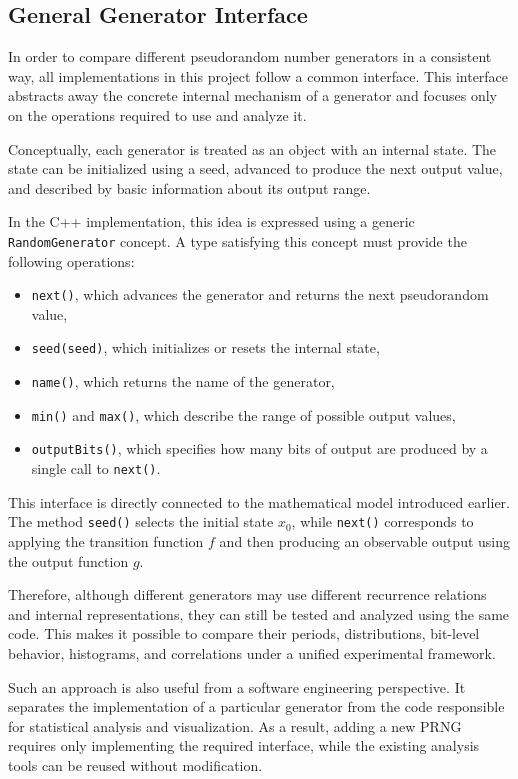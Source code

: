 \subsection{General Generator Interface}

In order to compare different pseudorandom number generators in a consistent way, all implementations in this project follow a common interface. This interface abstracts away the concrete internal mechanism of a generator and focuses only on the operations required to use and analyze it.

Conceptually, each generator is treated as an object with an internal state. The state can be initialized using a seed, advanced to produce the next output value, and described by basic information about its output range.

In the C++ implementation, this idea is expressed using a generic \texttt{RandomGenerator} concept. A type satisfying this concept must provide the following operations:

\begin{itemize}
    \item \texttt{next()}, which advances the generator and returns the next pseudorandom value,
    \item \texttt{seed(seed)}, which initializes or resets the internal state,
    \item \texttt{name()}, which returns the name of the generator,
    \item \texttt{min()} and \texttt{max()}, which describe the range of possible output values,
    \item \texttt{outputBits()}, which specifies how many bits of output are produced by a single call to \texttt{next()}.
\end{itemize}

This interface is directly connected to the mathematical model introduced earlier. The method \texttt{seed()} selects the initial state $x_0$, while \texttt{next()} corresponds to applying the transition function $f$ and then producing an observable output using the output function $g$.

Therefore, although different generators may use different recurrence relations and internal representations, they can still be tested and analyzed using the same code. This makes it possible to compare their periods, distributions, bit-level behavior, histograms, and correlations under a unified experimental framework.

Such an approach is also useful from a software engineering perspective. It separates the implementation of a particular generator from the code responsible for statistical analysis and visualization. As a result, adding a new PRNG requires only implementing the required interface, while the existing analysis tools can be reused without modification.


